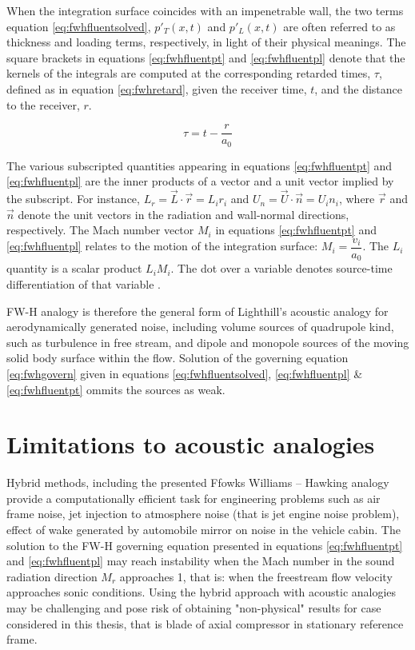 When the integration surface coincides with an impenetrable wall, the two terms equation \ref{eq:fwhfluentsolved}, $ p'_T(x, t)$ and $p'_L(x, t)$ are often referred to as thickness and loading terms, respectively, in light of their physical meanings. The square brackets in equations \ref{eq:fwhfluentpt} and \ref{eq:fwhfluentpl} denote that the kernels of the integrals are computed at the corresponding retarded times, $\tau$, defined as in equation \ref{eq:fwhretard}, given the receiver time, $t$, and the distance to the receiver, $r$.

\begin{equation} \label{eq:fwhretard}
\tau = t - \frac{r}{a_0}
\end{equation}

The various subscripted quantities appearing in equations \ref{eq:fwhfluentpt} and \ref{eq:fwhfluentpl} are the inner products of a vector and a unit vector implied by the subscript. For instance, $L_r = \vec{L} \cdot \vec{r} = L_i r_i$ and $U_n = \vec{U} \cdot \vec{n} = U_i n_i$, where $\vec{r}$ and $\vec{n}$ denote the unit vectors in the radiation and wall-normal directions, respectively. The Mach number vector $M_i$ in equations \ref{eq:fwhfluentpt} and \ref{eq:fwhfluentpl} relates to the motion of the integration surface: $M_i = \dfrac{v_i}{a_0}$. The $L_i$ quantity is a scalar product $L_i M_i$. The dot over a variable denotes source-time differentiation of that variable \citep{fluenttheory} \citep{FWH} \citep{fwhaiaa}.

FW-H analogy is therefore the general form of Lighthill's acoustic analogy for aerodynamically generated noise, including volume sources of quadrupole kind, such as turbulence in free stream, and dipole and monopole sources of the moving solid body surface within the flow. Solution of the governing equation \ref{eq:fwhgovern} given in equations \ref{eq:fwhfluentsolved}, \ref{eq:fwhfluentpl} \& \ref{eq:fwhfluentpt} ommits the sources as weak. 

\section{Limitations to acoustic analogies}
Hybrid methods, including the presented Ffowks Williams -- Hawking analogy provide a computationally efficient task for engineering problems such as air frame noise, jet injection to atmosphere noise (that is jet engine noise problem), effect of wake generated by automobile mirror on noise in the vehicle cabin. The solution to the FW-H governing equation presented in equations \ref{eq:fwhfluentpt} and \ref{eq:fwhfluentpl} may reach instability when the Mach number in the sound radiation direction $M_r$ approaches 1, that is: when the freestream flow velocity approaches sonic conditions. Using the hybrid approach with acoustic analogies may be challenging and pose risk of obtaining "non-physical" results for case considered in this thesis, that is blade of axial compressor in stationary reference frame.

